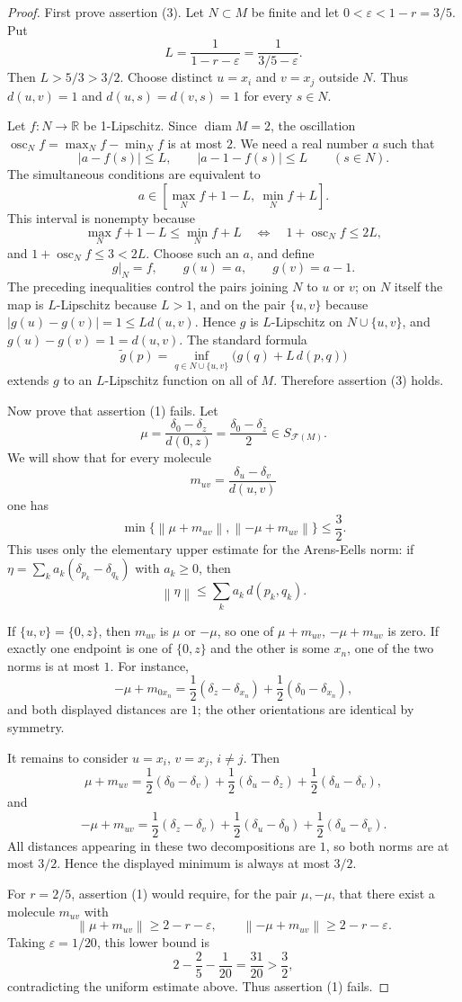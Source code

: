 \documentclass[11pt]{article}
\newcommand{\F}{\mathcal F}
\newcommand{\R}{\mathbb R}
\newcommand{\diam}{\operatorname{diam}}
\newcommand{\de}{\delta}
\newcommand{\norm}[1]{\left\lVert #1\right\rVert}
\begin{document}
\begin{proof}
First prove assertion (3). Let \(N\subset M\) be finite and let
\(0<\varepsilon<1-r=3/5\). Put
\[
 L=\frac1{1-r-\varepsilon}=\frac1{3/5-\varepsilon}.
\]
Then \(L>5/3>3/2\). Choose distinct \(u=x_i\) and \(v=x_j\) outside \(N\).
Thus \(d(u,v)=1\) and \(d(u,s)=d(v,s)=1\) for every \(s\in N\).

Let \(f:N\to\R\) be 1-Lipschitz. Since \(\diam M=2\), the oscillation
\(\operatorname{osc}_N f=\max_N f-\min_N f\) is at most \(2\). We need a real
number \(a\) such that
\[
 |a-f(s)|\le L,\qquad |a-1-f(s)|\le L\qquad(s\in N).
\]
The simultaneous conditions are equivalent to
\[
 a\in [\max_N f+1-L,\ \min_N f+L].
\]
This interval is nonempty because
\[
 \max_N f+1-L\le \min_N f+L
 \quad\Longleftrightarrow\quad
 1+\operatorname{osc}_N f\le 2L,
\]
and \(1+\operatorname{osc}_N f\le 3<2L\). Choose such an \(a\), and define
\[
 g|_N=f,\qquad g(u)=a,\qquad g(v)=a-1.
\]
The preceding inequalities control the pairs joining \(N\) to \(u\) or \(v\);
on \(N\) itself the map is \(L\)-Lipschitz because \(L>1\), and on the pair
\(\{u,v\}\) because \(|g(u)-g(v)|=1\le Ld(u,v)\). Hence \(g\) is
\(L\)-Lipschitz on \(N\cup\{u,v\}\), and \(g(u)-g(v)=1=d(u,v)\). The standard
formula
\[
 \widetilde g(p)=\inf_{q\in N\cup\{u,v\}}\bigl(g(q)+L\,d(p,q)\bigr)
\]
extends \(g\) to an \(L\)-Lipschitz function on all of \(M\). Therefore
assertion (3) holds.

Now prove that assertion (1) fails. Let
\[
 \mu=\frac{\de_0-\de_z}{d(0,z)}=\frac{\de_0-\de_z}{2}\in S_{\F(M)}.
\]
We will show that for every molecule
\[
 m_{uv}=\frac{\de_u-\de_v}{d(u,v)}
\]
one has
\[
 \min\{\norm{\mu+m_{uv}},\norm{-\mu+m_{uv}}\}\le \frac32.
\]
This uses only the elementary upper estimate for the Arens-Eells norm:
if \(\eta=\sum_k a_k(\de_{p_k}-\de_{q_k})\) with \(a_k\ge0\), then
\[
 \norm{\eta}\le \sum_k a_k\,d(p_k,q_k).
\]

If \(\{u,v\}=\{0,z\}\), then \(m_{uv}\) is \(\mu\) or \(-\mu\), so one of
\(\mu+m_{uv}\), \(-\mu+m_{uv}\) is zero. If exactly one endpoint is one of
\(\{0,z\}\) and the other is some \(x_n\), one of the two norms is at most
\(1\). For instance,
\[
 -\mu+m_{0x_n}
 =\frac12(\de_z-\de_{x_n})+\frac12(\de_0-\de_{x_n}),
\]
and both displayed distances are \(1\); the other orientations are identical
by symmetry.

It remains to consider \(u=x_i\), \(v=x_j\), \(i\ne j\). Then
\[
 \mu+m_{uv}
 =\frac12(\de_0-\de_v)+\frac12(\de_u-\de_z)
  +\frac12(\de_u-\de_v),
\]
and
\[
 -\mu+m_{uv}
 =\frac12(\de_z-\de_v)+\frac12(\de_u-\de_0)
  +\frac12(\de_u-\de_v).
\]
All distances appearing in these two decompositions are \(1\), so both norms
are at most \(3/2\). Hence the displayed minimum is always at most \(3/2\).

For \(r=2/5\), assertion (1) would require, for the pair \(\mu,-\mu\), that
there exist a molecule \(m_{uv}\) with
\[
 \norm{\mu+m_{uv}}\ge 2-r-\varepsilon,\qquad
 \norm{-\mu+m_{uv}}\ge 2-r-\varepsilon.
\]
Taking \(\varepsilon=1/20\), this lower bound is
\[
 2-\frac25-\frac1{20}=\frac{31}{20}>\frac32,
\]
contradicting the uniform estimate above. Thus assertion (1) fails.
\end{proof}
\end{document}
